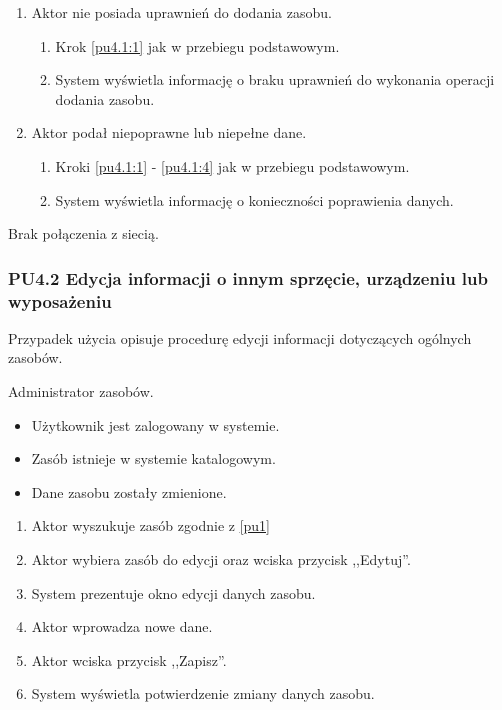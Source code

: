 \begin{enumerate}
\item Aktor nie posiada uprawnień do dodania zasobu.
	\begin{enumerate}[label*=\arabic*.]
		\item Krok \ref{pu4.1:1} jak w przebiegu podstawowym.
		\item System wyświetla informację o braku uprawnień do wykonania operacji dodania zasobu.
	\end{enumerate}
\item Aktor podał niepoprawne lub niepełne dane.
	\begin{enumerate}[label*=\arabic*.]
		\item Kroki \ref{pu4.1:1} - \ref{pu4.1:4} jak w przebiegu podstawowym.
		\item System wyświetla informację o konieczności poprawienia danych.
	\end{enumerate}
\end{enumerate}

Brak połączenia z siecią.

\subsubsection{PU4.2 Edycja informacji o innym sprzęcie, urządzeniu lub wyposażeniu}

Przypadek użycia opisuje procedurę edycji informacji dotyczących ogólnych zasobów.

Administrator zasobów.

\begin{itemize}
\item Użytkownik jest zalogowany w systemie.
\item Zasób istnieje w systemie katalogowym.
\end{itemize}

\begin{itemize}
\item Dane zasobu zostały zmienione.
\end{itemize}

\begin{enumerate}
\item \label{pu4.2:1} Aktor wyszukuje zasób zgodnie z \ref{pu1}
\item \label{pu4.2:2} Aktor wybiera zasób do edycji oraz wciska przycisk ,,Edytuj''.
\item System prezentuje okno edycji danych zasobu.
\item Aktor wprowadza nowe dane.
\item \label{pu4.2:5} Aktor wciska przycisk ,,Zapisz''.
\item System wyświetla potwierdzenie zmiany danych zasobu.
\end{enumerate}

